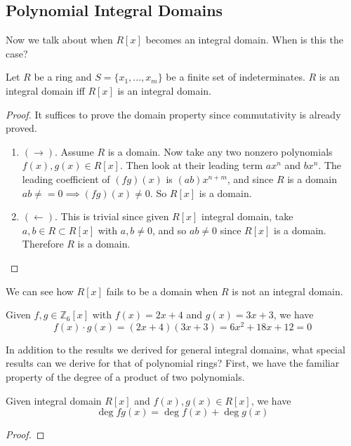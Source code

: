 \subsection{Polynomial Integral Domains}

  Now we talk about when $R[x]$ becomes an integral domain. When is this the case? 

  \begin{theorem}
    Let $R$ be a ring and $S = \{x_1, \ldots, x_m\}$ be a finite set of indeterminates. $R$ is an integral domain iff $R[x]$ is an integral domain. 
  \end{theorem}
  \begin{proof}
    It suffices to prove the domain property since commutativity is already proved. 
    \begin{enumerate}
      \item $(\rightarrow)$. Assume $R$ is a domain. Now take any two nonzero polynomials $f(x), g(x) \in R[x]$. Then look at their leading term $ax^n$ and $bx^n$. The leading coefficient of $(fg)(x)$ is $(ab) x^{n+m}$, and since $R$ is a domain $ab \neq = 0 \implies (fg)(x) \neq 0$. So $R[x]$ is a domain. 
      \item $(\leftarrow)$. This is trivial since given $R[x]$ integral domain, take $a, b \in R \subset R[x]$ with $a, b \neq 0$, and so $ab \neq 0$ since $R[x]$ is a domain. Therefore $R$ is a domain. 
    \end{enumerate}
  \end{proof}

  We can see how $R[x]$ fails to be a domain when $R$ is not an integral domain. 

  \begin{example}
    Given $f, g \in \mathbb{Z}_6 [x]$ with $f(x) = 2x + 4$ and $g(x) = 3x + 3$, we have 
    \begin{equation}
      f(x) \cdot g(x) = (2x + 4)(3x + 3) = 6x^2 + 18 x + 12 = 0
    \end{equation}
  \end{example}

  In addition to the results we derived for general integral domains, what special results can we derive for that of polynomial rings? First, we have the familiar property of the degree of a product of two polynomials. 

  \begin{lemma}
    Given integral domain $R[x]$ and $f(x), g(x) \in R[x]$, we have 
    \begin{equation}
      \deg{fg(x)} = \deg{f(x)} + \deg{g(x)}
    \end{equation}
  \end{lemma}
  \begin{proof}
    
  \end{proof}

